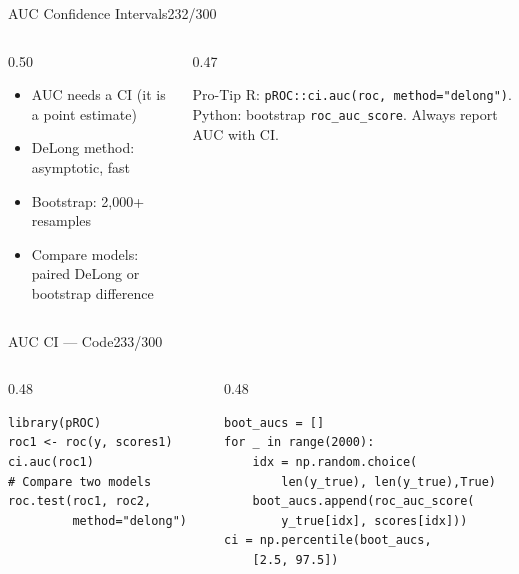 \documentclass[10pt]{beamer}
\newcommand{\smark}[1]{\hfill{\scriptsize\color{codegray}#1}}
\begin{document}
\begin{frame}{AUC Confidence Intervals}\smark{232/300}
\begin{columns}[T]
\begin{column}{0.50\textwidth}
\begin{itemize}
    \item AUC needs a CI (it is a point estimate)
    \item DeLong method: asymptotic, fast
    \item Bootstrap: 2{,}000+ resamples
    \item Compare models: paired DeLong or bootstrap difference
\end{itemize}
\end{column}
\begin{column}{0.47\textwidth}
\begin{alertblock}{Pro-Tip}
    \scriptsize R: \texttt{pROC::ci.auc(roc, method="delong")}. Python: bootstrap \texttt{roc\_auc\_score}. Always report AUC with CI.
\end{alertblock}
\end{column}
\end{columns}
\end{frame}

\begin{frame}[fragile]{AUC CI --- Code}\smark{233/300}
\begin{columns}[T]
\begin{column}{0.48\textwidth}
\begin{lstlisting}[style=Rstyle]
library(pROC)
roc1 <- roc(y, scores1)
ci.auc(roc1)
# Compare two models
roc.test(roc1, roc2,
         method="delong")
\end{lstlisting}
\end{column}
\begin{column}{0.48\textwidth}
\begin{lstlisting}[style=Pystyle]
boot_aucs = []
for _ in range(2000):
    idx = np.random.choice(
        len(y_true), len(y_true),True)
    boot_aucs.append(roc_auc_score(
        y_true[idx], scores[idx]))
ci = np.percentile(boot_aucs,
    [2.5, 97.5])
\end{lstlisting}
\end{column}
\end{columns}
\end{frame}
\end{document}
